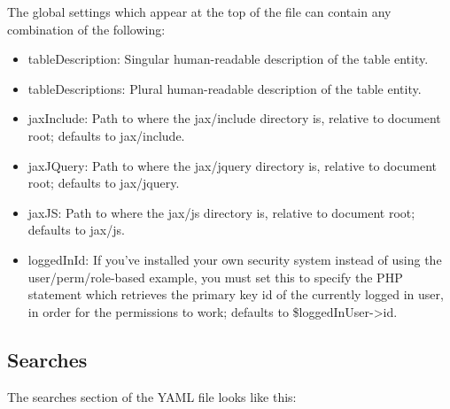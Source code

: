 \documentclass[letterpaper,10pt,english]{sphinxmanual}
\begin{document}
The global settings which appear at the top of the file can contain any combination of the
following:
\begin{itemize}
\item {} 
tableDescription: Singular human-readable description of the table entity.

\item {} 
tableDescriptions: Plural human-readable description of the table entity.

\item {} 
jaxInclude: Path to where the jax/include directory is, relative to document root; defaults to
jax/include.

\item {} 
jaxJQuery: Path to where the jax/jquery directory is, relative to document root; defaults to
jax/jquery.

\item {} 
jaxJS: Path to where the jax/js directory is, relative to document root; defaults to jax/js.

\item {} 
loggedInId: If you've installed your own security system instead of using the user/perm/role-based
example, you must set this to specify the PHP statement which retrieves the primary key id of the
currently logged in user, in order for the permissions to work; defaults to \$loggedInUser-\textgreater{}id.

\end{itemize}


\subsection{Searches}
\label{jaxFrameworkGuide:searches}
The searches section of the YAML file looks like this:
\end{document}
